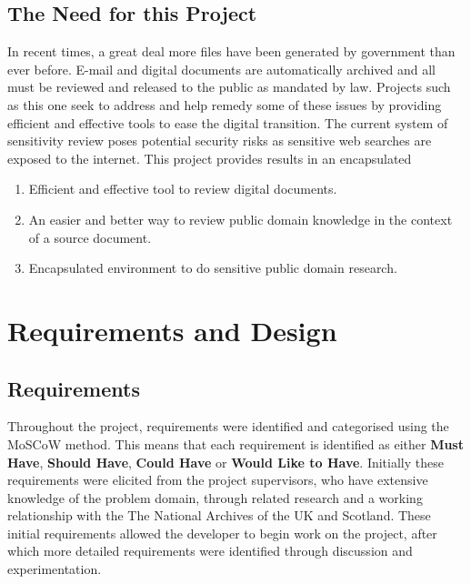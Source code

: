 \documentclass{l4proj}
\begin{document}
\section{The Need for this Project}
In recent times, a great deal more files have been generated by government than ever before. E-mail and digital documents are automatically archived and all must be reviewed and released to the public as mandated by law.  
Projects such as this one seek to address and help remedy some of these issues by providing efficient and effective tools to ease the digital transition.
The current system of sensitivity review poses potential security risks as sensitive web searches are exposed to the internet. This project provides results in an encapsulated
\begin{center}
\begin{enumerate}[label=\textbf{Need.\arabic*}]
\item Efficient and effective tool to review digital documents.
\item An easier and better way to review public domain knowledge in the context of a source document.
\item Encapsulated environment to do sensitive public domain research.
\end{enumerate}
\end{center}

\chapter{Requirements and Design} \label{requirementsanddesign}
\section{Requirements}
Throughout the project, requirements were identified and categorised using the MoSCoW method. This means that each requirement is identified as either \textbf{Must Have}, \textbf{Should Have}, \textbf{Could Have} or \textbf{Would Like to Have}.
Initially these requirements were elicited from the project supervisors, who have extensive knowledge of the problem domain, through related research and a working relationship with the The National Archives of the UK and Scotland.
These initial requirements allowed the developer to begin work on the project, after which more detailed requirements were identified through discussion and experimentation.
\end{document}
